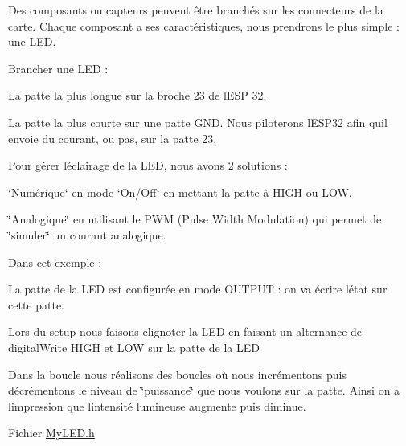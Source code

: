 Des composants ou capteurs peuvent être branchés sur les connecteurs de la carte. Chaque composant a ses caractéristiques, nous prendrons le plus simple \+: une LED.

Brancher une LED \+:
\begin{DoxyItemize}
\item La patte la plus longue sur la broche 23 de l\textquotesingle{}ESP 32,
\item La patte la plus courte sur une patte GND. Nous piloterons l\textquotesingle{}ESP32 afin qu\textquotesingle{}il envoie du courant, ou pas, sur la patte 23.
\end{DoxyItemize}

Pour gérer l\textquotesingle{}éclairage de la LED, nous avons 2 solutions \+:
\begin{DoxyItemize}
\item \char`\"{}\+Numérique\char`\"{} en mode \char`\"{}\+On/\+Off\char`\"{} en mettant la patte à HIGH ou LOW.
\item \char`\"{}\+Analogique\char`\"{} en utilisant le PWM (Pulse Width Modulation) qui permet de \char`\"{}simuler\char`\"{} un courant analogique.
\end{DoxyItemize}

Dans cet exemple \+:
\begin{DoxyItemize}
\item La patte de la LED est configurée en mode OUTPUT \+: on va écrire l\textquotesingle{}état sur cette patte.
\item Lors du setup nous faisons clignoter la LED en faisant un alternance de digital\+Write HIGH et LOW sur la patte de la LED
\item Dans la boucle nous réalisons des boucles où nous incrémentons puis décrémentons le niveau de \char`\"{}puissance\char`\"{} que nous voulons sur la patte. Ainsi on a l\textquotesingle{}impression que l\textquotesingle{}intensité lumineuse augmente puis diminue.
\end{DoxyItemize}

Fichier \mbox{\hyperlink{_my_l_e_d_8h}{My\+LED.\+h}} 